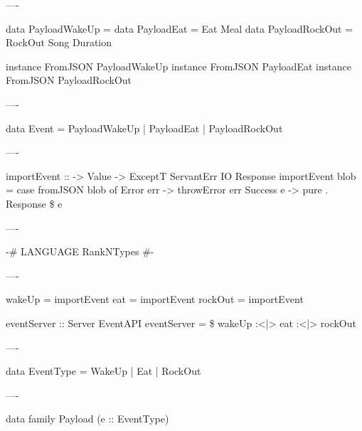 ----

\begin{hs}
  data PayloadWakeUp  = 
  data PayloadEat     = Eat Meal
  data PayloadRockOut = RockOut Song Duration

  instance FromJSON PayloadWakeUp
  instance FromJSON PayloadEat
  instance FromJSON PayloadRockOut
\end{hs}

----

\begin{raw}
  data Event = PayloadWakeUp  
             | PayloadEat     
             | PayloadRockOut 

\end{raw}

----

\begin{raw}
  importEvent :: 
              -> Value
              -> ExceptT ServantErr IO Response
  importEvent  blob =
    case fromJSON blob of
      Error   err -> throwError err
      Success e   -> pure . Response \$  e
\end{raw}

----

\begin{raw}
  {-# LANGUAGE RankNTypes #-}
\end{raw}

----

\begin{raw}
  wakeUp  = importEvent 
  eat     = importEvent 
  rockOut = importEvent 

  eventServer :: Server EventAPI
  eventServer =  \$
    wakeUp :<|> eat :<|> rockOut
\end{raw}

----

\begin{hs}
  data EventType = WakeUp | Eat | RockOut
\end{hs}

----

\begin{hs}
  data family Payload (e :: EventType)
\end{hs}

